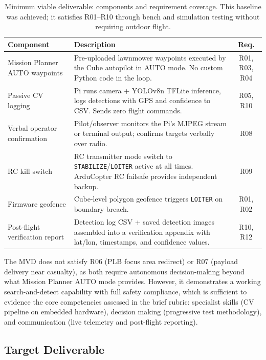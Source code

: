 \begin{table}[htbp]
  \centering\small
  \caption{Minimum viable deliverable: components and requirement coverage.  This baseline was achieved; it satisfies R01--R10 through bench and simulation testing without requiring outdoor flight.}\label{tab:mvd}
  \begin{tabularx}{\linewidth}{@{}p{4.2cm}X c@{}}
    \toprule
    \textbf{Component} & \textbf{Description} & \textbf{Req.} \\
    \midrule
    Mission Planner AUTO waypoints & Pre-uploaded lawnmower waypoints executed by the Cube autopilot in AUTO mode. No custom Python code in the loop. & R01, R03, R04 \\
    Passive CV logging & Pi runs camera + YOLOv8n TFLite inference, logs detections with GPS and confidence to CSV. Sends zero flight commands. & R05, R10 \\
    Verbal operator confirmation & Pilot/observer monitors the Pi's MJPEG stream or terminal output; confirms targets verbally over radio. & R08 \\
    RC kill switch & RC transmitter mode switch to \texttt{STABILIZE}/\texttt{LOITER} active at all times. ArduCopter RC failsafe provides independent backup. & R09 \\
    Firmware geofence & Cube-level polygon geofence triggers \texttt{LOITER} on boundary breach. & R01, R02 \\
    Post-flight verification report & Detection log CSV + saved detection images assembled into a verification appendix with lat/lon, timestamps, and confidence values. & R10, R12 \\
    \bottomrule
  \end{tabularx}
\end{table}

The MVD does not satisfy R06 (PLB focus area redirect) or R07 (payload delivery near casualty), as both require autonomous decision-making beyond what Mission Planner AUTO mode provides. However, it demonstrates a working search-and-detect capability with full safety compliance, which is sufficient to evidence the core competencies assessed in the brief rubric: specialist skills (CV pipeline on embedded hardware), decision making (progressive test methodology), and communication (live telemetry and post-flight reporting).

\subsection{Target Deliverable}\label{sec:target}

